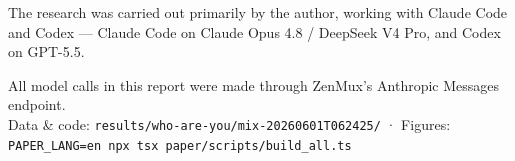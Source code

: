 \documentclass[11pt]{article}
\begin{document}
\noindent The research was carried out primarily by the author, working with Claude Code and
Codex --- Claude Code on Claude Opus 4.8 / DeepSeek V4 Pro, and Codex on GPT-5.5.

\vfill
\begin{center}\small\color{sepia}
All model calls in this report were made through ZenMux's Anthropic Messages endpoint.\\
Data \& code: \texttt{results/who-are-you/mix-20260601T062425/} · Figures:
\texttt{PAPER\_LANG=en npx tsx paper/scripts/build\_all.ts}
\end{center}
\end{document}
